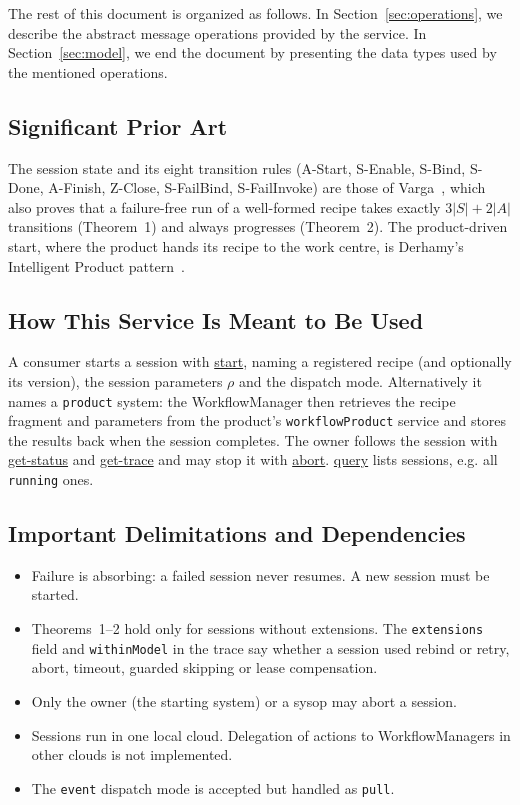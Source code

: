 \documentclass[a4paper]{arrowhead}
\newcommand{\oref}[1]{{\textcolor{ArrowheadBlue}{\hyperref[sec:operations:#1]{#1}}}}
\begin{document}
The rest of this document is organized as follows.
In Section~\ref{sec:operations}, we describe the abstract message operations provided by the service.
In Section~\ref{sec:model}, we end the document by presenting the data types used by the mentioned operations.

\subsection{Significant Prior Art}
The session state and its eight transition rules (A-Start, S-Enable, S-Bind, S-Done, A-Finish, Z-Close,
S-FailBind, S-FailInvoke) are those of Varga~\cite{varga2026}, which also proves that a failure-free run of a
well-formed recipe takes exactly $3|S| + 2|A|$ transitions (Theorem~1) and always progresses (Theorem~2). The
product-driven start, where the product hands its recipe to the work centre, is Derhamy's Intelligent Product
pattern~\cite{derhamy2018workflow}.

\subsection{How This Service Is Meant to Be Used}
A consumer starts a session with \oref{start}, naming a registered recipe (and optionally its version), the
session parameters $\rho$ and the dispatch mode. Alternatively it names a \texttt{product} system: the WorkflowManager
then retrieves the recipe fragment and parameters from the product's \texttt{workflow\allowbreak{}Product} service and stores the
results back when the session completes. The owner follows the session with \oref{get-status} and \oref{get-trace} and may
stop it with \oref{abort}. \oref{query} lists sessions, e.g. all \texttt{running} ones.

\subsection{Important Delimitations and Dependencies}
\label{sec:delimitations}
\begin{itemize}
\item Failure is absorbing: a failed session never resumes. A new session must be started.
\item Theorems~1--2 hold only for sessions without extensions. The \texttt{extensions} field and \texttt{withinModel} in the trace say whether a session used rebind or retry, abort, timeout, guarded skipping or lease compensation.
\item Only the owner (the starting system) or a sysop may abort a session.
\item Sessions run in one local cloud. Delegation of actions to WorkflowManagers in other clouds is not implemented.
\item The \texttt{event} dispatch mode is accepted but handled as \texttt{pull}.
\end{itemize}
\end{document}
